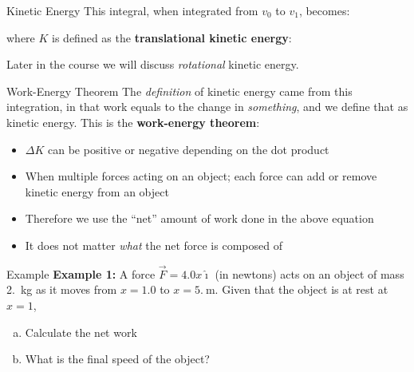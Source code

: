 \documentclass[12pt,compress,aspectratio=169]{beamer}
\begin{document}
\begin{frame}{Kinetic Energy}
  This integral, when integrated from $v_0$ to $v_1$, becomes:

  
  where $K$ is defined as the \textbf{translational kinetic energy}:


  Later in the course we will discuss \emph{rotational} kinetic energy.
\end{frame}



\begin{frame}{Work-Energy Theorem}
  The \emph{definition} of kinetic energy came from this integration, in that
  work equals to the change in \emph{something}, and we define that as kinetic
  energy. This is the \textbf{work-energy theorem}:

  \begin{itemize}
  \item\vspace{-.15in} $\Delta K$ can be positive or negative depending on the
    dot product
  \item When multiple forces acting on an object; each force can add or remove
    kinetic energy from an object
  \item Therefore we use the ``net'' amount of work done in the above equation
  \item It does not matter \emph{what} the net force is composed of
  \end{itemize}
\end{frame}



\begin{frame}{Example}
  \textbf{Example 1:} A force $\vec F=4.0x\hat\imath$ (in newtons) acts
  on an object of mass \SI{2.}{\kilo\gram} as it moves from $x=1.0$ to
  $x=\SI{5.}\metre$. Given that the object is at rest at $x=1$,
  \begin{enumerate}[(a)]
  \item Calculate the net work
  \item What is the final speed of the object?
  \end{enumerate}
\end{frame}
\end{document}
